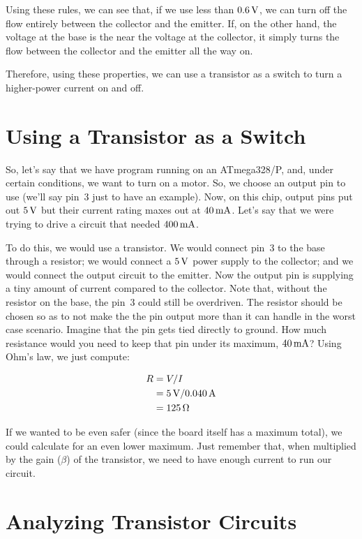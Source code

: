 Using these rules, we can see that, if we use less than $0.6\,\si{\volt}$, we can turn off the flow entirely between the collector and the emitter.
If, on the other hand, the voltage at the base is the near the voltage at the collector, it simply turns the flow between the collector and the emitter all the way on.

Therefore, using these properties, we can use a transistor as a switch to turn a higher-power current on and off.

\section{Using a Transistor as a Switch}

So, let's say that we have program running on an ATmega328/P, and, under certain conditions, we want to turn on a motor.
So, we choose an output pin to use (we'll say pin~3 just to have an example).
Now, on this chip, output pins put out $5\,\si{\volt}$ but their current rating maxes out at $40\,\si{\milli\ampere}$.
Let's say that we were trying to drive a circuit that needed $400\,\si{\milli\ampere}$.

To do this, we would use a transistor.
We would connect pin~3 to the base through a resistor; we would connect a $5\,\si{\volt}$ power supply to the collector; and we would connect the output circuit to the emitter.
Now the output pin is supplying a tiny amount of current compared to the collector.
Note that, without the resistor on the base, the pin~3 could still be overdriven. 
The resistor should be chosen so as to not make the the pin output more than it can handle in the worst case scenario.
Imagine that the pin gets tied directly to ground.
How much resistance would you need to keep that pin under its maximum, $40\,\si{\milli\ampere}$?
Using Ohm's law, we just compute:

\begin{align*}
R &= V / I \\
  &= 5\,\si{\volt} / 0.040\,\si{\ampere} \\
  &= 125\,\si{\ohm}
\end{align*}

If we wanted to be even safer (since the board itself has a maximum total), we could calculate for an even lower maximum.
Just remember that, when multiplied by the gain ($\beta$) of the transistor, we need to have enough current to run our circuit.

\section{Analyzing Transistor Circuits}

